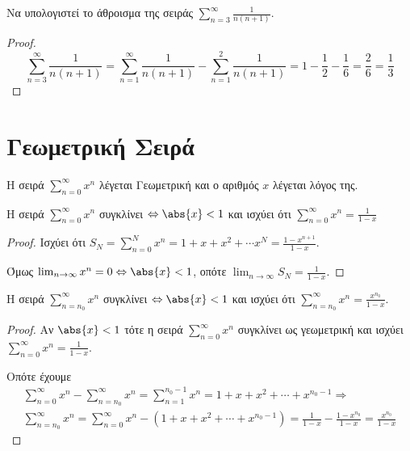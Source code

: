 \documentclass[main.tex]{subfiles}
\begin{document}
\begin{example}
    Να υπολογιστεί το άθροισμα της σειράς $ \sum_{n=3}^{\infty} \frac{1}{n(n+1)} $.
\end{example}
\begin{proof}
    \[
        \sum_{n=3}^{\infty} \frac{1}{n(n+1)} = \sum_{n=1}^{\infty} 
        \frac{1}{n(n+1)} - \sum_{n=1}^{2} \frac{1}{n(n+1)} = 1 - \frac{1}{2} - 
        \frac{1}{6} = \frac{2}{6} = \frac{1}{3}
    \] 
\end{proof}


\section{Γεωμετρική Σειρά}

Η σειρά $ \sum_{n=0}^{\infty} x^{n} $ λέγεται Γεωμετρική και ο αριθμός $x$ λέγεται 
λόγος της.

\begin{prop}
    Η σειρά $ \sum_{n=0}^{\infty} x^{n} $ συγκλίνει $ \Leftrightarrow \abs{x} < 1 $
    και ισχύει ότι $ \sum_{n=0}^{\infty} x^{n} = \frac{1}{1-x} $
\end{prop}
\begin{proof}
\item {}
    Ισχύει ότι $ S_{N} = \sum_{n=0}^{N} x^{n} =  1 + x + x^{2} + \cdots x^{N} = 
    \frac{1- x^{n+1}}{1-x} $.

    Όμως $ \lim_{n \to \infty} x^{n} = 0 \Leftrightarrow \abs{x} < 1 $, οπότε 
    $ \lim_{n \to \infty} S_{N} = \frac{1}{1-x} $.
\end{proof}

\begin{cor}
    Η σειρά $ \sum_{n= n_{0}}^{\infty} x^{n} $ συγκλίνει $ \Leftrightarrow \abs{x} <1 $
    και ισχύει ότι $ \sum_{n= n_{0}}^{\infty} x^{n} = \frac{x^{n_{0}}}{1-x} $.
\end{cor}
\begin{proof}
\item {}
    Αν $ \abs{x} < 1 $ τότε η σειρά $ \sum_{n=0}^{\infty} x^{n} $ συγκλίνει ως 
    γεωμετρική και ισχύει $ \sum_{n=0}^{\infty} x^{n} = \frac{1}{1-x} $. 

    Οπότε έχουμε
    \begin{align*}
        \sum_{n=0}^{\infty} x^{n} - \sum_{n= n_{0}}^{\infty} x^{n} = 
        \sum_{n= 1}^{n_{0} -1} x^{n} = 1 + x + x^{2} + \cdots + x^{n_{0}-1} 
        \Rightarrow \\
        \sum_{n= n_{0}}^{\infty} x^{n} = \sum_{n=0}^{\infty} x^{n} - (1 + x + x^{2} + 
        \cdots + x^{n_{0}-1}) = \frac{1}{1-x} - \frac{1- x^{n_{0}}}{1-x} = 
        \frac{x^{n_{0}}}{1-x}  
    \end{align*} 
\end{proof}
\end{document}
